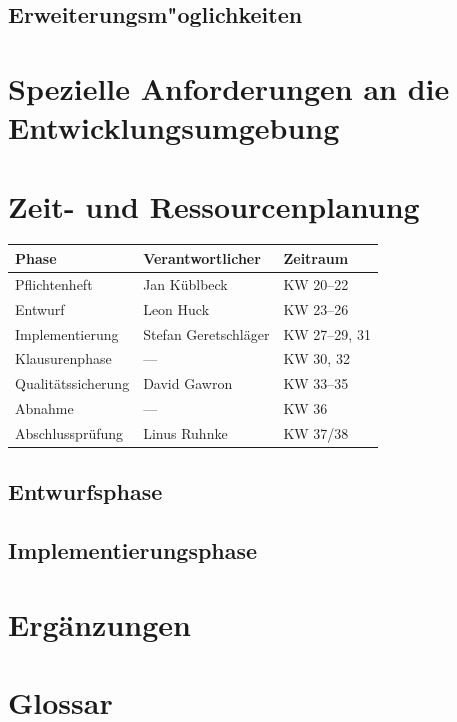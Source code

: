 \documentclass[parskip=full]{scrartcl}
\begin{document}
\subsection{Erweiterungsm"oglichkeiten}

\section{Spezielle Anforderungen an die Entwicklungsumgebung}

\section{Zeit- und Ressourcenplanung}

\begin{tabular}{| l | l | l |}
	\hline
	\textbf{Phase} & \textbf{Verantwortlicher} & \textbf{Zeitraum} \\ \hline
	Pflichtenheft & Jan Küblbeck & KW 20–22 \\
	Entwurf & Leon Huck & KW 23–26 \\
	Implementierung & Stefan Geretschläger & KW 27–29, 31 \\
	Klausurenphase & — & KW 30, 32 \\
	Qualitätssicherung & David Gawron & KW 33–35 \\
	Abnahme & — & KW 36 \\
	Abschlussprüfung & Linus Ruhnke & KW 37/38 \\
	\hline
\end{tabular}

\subsection{Entwurfsphase}

\subsection{Implementierungsphase}

\section{Ergänzungen}

\section{Glossar}

\renewcommand*{\glossarysection}[2][]{}	%
\printnoidxglossaries				%
\end{document}
